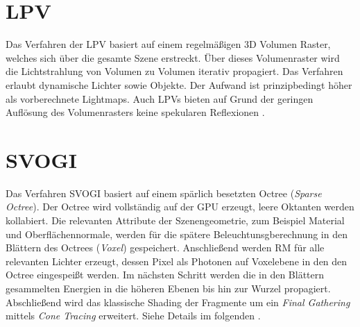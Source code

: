 \section{\acf{LPV}}

Das Verfahren der \ac{LPV} basiert auf einem regelmäßigen 3D Volumen Raster, welches sich über die gesamte Szene erstreckt. Über dieses Volumenraster wird die Lichtstrahlung von Volumen zu Volumen iterativ propagiert. Das Verfahren erlaubt dynamische Lichter sowie Objekte. Der Aufwand ist prinzipbedingt höher als vorberechnete Lightmaps. Auch LPVs bieten auf Grund der geringen Auflösung des Volumenrasters keine spekularen Reflexionen \cite{kaplanyan2009light}.

\warn{\blindtext}


\section{\acf{SVOGI}}

Das Verfahren \ac{SVOGI} basiert auf einem spärlich besetzten Octree (\textit{Sparse Octree}). Der Octree wird vollständig auf der GPU erzeugt, leere Oktanten werden kollabiert.  Die relevanten Attribute der Szenengeometrie, zum Beispiel Material und Oberflächennormale, werden für die spätere Beleuchtunsgberechnung in den Blättern des Octrees (\textit{Voxel}) gespeichert. Anschließend werden \ac{RM} für alle relevanten Lichter erzeugt, dessen Pixel als Photonen auf Voxelebene in den den Octree eingespeißt werden. Im nächsten Schritt werden die in den Blättern gesammelten Energien in die höheren Ebenen bis hin zur Wurzel propagiert. Abschließend wird das klassische Shading der Fragmente um ein \textit{Final Gathering} mittels \textit{Cone Tracing} erweitert. Siehe Details im folgenden .






